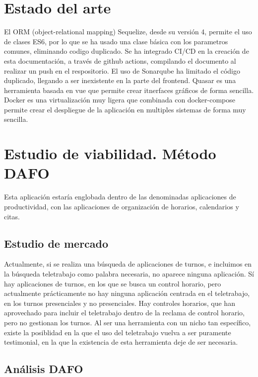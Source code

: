 \documentclass[11pt,spanish,listoffigures,listoftables]{tfgetsinf}
\begin{document}
\chapter{Estado del arte}

El ORM (object-relational mapping) Sequelize, desde su versión 4, permite el uso de clases ES6, por lo que se ha usado una clase básica con los parametros comunes, eliminando codigo duplicado.
Se ha integrado CI/CD en la creación de esta documentación, a través de github actions, compilando el documento al realizar un push en el respositorio.
El uso de Sonarqube ha limitado el código duplicado, llegando a ser inexistente en la parte del frontend.
Quasar es una herramienta basada en vue que permite crear itnerfaces gráficos de forma sencilla.
Docker es una virtualización muy ligera que combinada con docker-compose permite crear el despliegue de la aplicación en multiples sistemas de forma muy sencilla.

\chapter{Estudio de viabilidad. Método DAFO}

Esta aplicación estaría englobada dentro de las denominadas aplicaciones de productividad, con las aplicaciones de organización de horarios, calendarios y citas.

\section{Estudio de mercado}

Actualmente, si se realiza una búsqueda de aplicaciones de turnos, e incluimos en la búsqueda teletrabajo como palabra necesaria, no aparece ninguna aplicación. 
Sí hay aplicaciones de turnos, en los que se busca un control horario, pero actualmente prácticamente no hay ninguna aplicación centrada en el teletrabajo, en los turnos presenciales y no presenciales.
Hay controles horarios, que han aprovechado para incluir el teletrabajo dentro de la reclama de control horario, pero no gestionan los turnos.
Al ser una herramienta con un nicho tan específico, existe la posiblidad en la que el uso del teletrabajo vuelva a ser puramente testimonial, en la que la existencia de esta herramienta deje de ser necesaria.
\section{Análisis DAFO}
\end{document}
